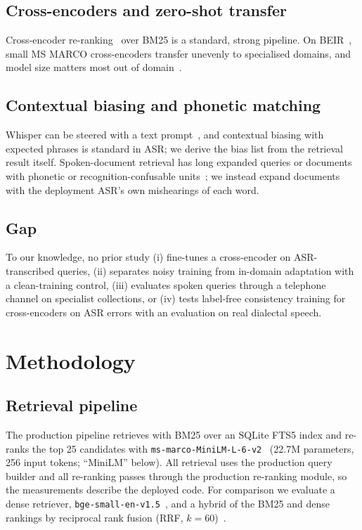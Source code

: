 \documentclass[conference]{IEEEtran}
\begin{document}
\subsection{Cross-encoders and zero-shot transfer}
Cross-encoder re-ranking~\cite{nogueira} over BM25 is a standard, strong pipeline. On BEIR~\cite{beir}, small MS MARCO cross-encoders transfer unevenly to specialised domains, and model size matters most out of domain~\cite{rosa}.

\subsection{Contextual biasing and phonetic matching}
Whisper can be steered with a text prompt~\cite{peng23}, and contextual biasing with expected phrases is standard in ASR; we derive the bias list from the retrieval result itself. Spoken-document retrieval has long expanded queries or documents with phonetic or recognition-confusable units~\cite{ng98,lee15}; we instead expand documents with the deployment ASR's own mishearings of each word.

\subsection{Gap}
To our knowledge, no prior study (i) fine-tunes a cross-encoder on ASR-transcribed queries, (ii) separates noisy training from in-domain adaptation with a clean-training control, (iii) evaluates spoken queries through a telephone channel on specialist collections, or (iv) tests label-free consistency training for cross-encoders on ASR errors with an evaluation on real dialectal speech.

\section{Methodology}
\subsection{Retrieval pipeline}
The production pipeline retrieves with BM25 over an SQLite FTS5 index and re-ranks the top 25 candidates with \texttt{ms-marco-MiniLM-L-6-v2}~\cite{minilm} (22.7M parameters, 256 input tokens; ``MiniLM'' below). All retrieval uses the production query builder and all re-ranking passes through the production re-ranking module, so the measurements describe the deployed code. For comparison we evaluate a dense retriever, \texttt{bge-small-en-v1.5}~\cite{bge}, and a hybrid of the BM25 and dense rankings by reciprocal rank fusion (RRF, $k=60$)~\cite{rrf}.
\end{document}
